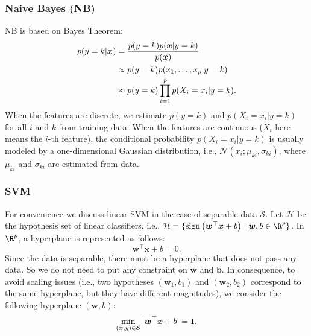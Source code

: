     \subsubsection{Naive Bayes (NB)}
        NB is based on Bayes Theorem: 
            \begin{equation}
                \begin{aligned}
                    p(y=k | \bm{x}) & = \frac{p(y=k) p(\bm{x} | y=k)}{p(\bm{x})} \\
                    & \propto p(y=k) p(x_1, \ldots, x_{p} | y=k) \\
                    & \approx p(y=k) \prod_{i=1}^{p}{p(X_i = x_i | y=k)}.
                \end{aligned}
            \end{equation}
        When the features are discrete, we estimate $p(y=k)$ and $p(X_i = x_i | y=k)$ for all $i$ and $k$ from training data.
        When the features are continuous ($X_i$ here means the $i$-th feature), the conditional probability $p(X_i = x_i | y=k)$  is usually modeled by a one-dimensional Gaussian distribution, i.e., $\mathcal{N}(x_i; \mu_{ki}, \sigma_{ki})$, where $\mu_{ki}$ and $\sigma_{ki}$ are estimated from data.
        
    \subsubsection{SVM}
        For convenience we discuss linear SVM in the case of separable data $\mathcal{S}$.
        Let $\mathcal{H}$ be the hypothesis set of linear classifiers, i.e., $\mathcal{H}=\Set{\Sign{\bm{w}^\top \bm{x} + b}}{\bm{w}, b \in \R^\nfeat}$.
        In $\R^\nfeat$, a hyperplane is represented as follows:
            \begin{equation}
                \bm{w}^\top \bm{x} + b = 0.
            \end{equation}
        Since the data is separable, there must be a hyperplane that does not pass any data.
        So we do not need to put any constraint on $\bm{w}$ and $\bm{b}$.
        In consequence, to avoid scaling issues (i.e., two hypotheses $(\bm{w}_1, b_1)$ and $(\bm{w}_2, b_2)$ correspond to the same hyperplane, but they have different magnitudes), we consider the following hyperplane $(\bm{w}, b)$:
            \begin{equation}
                \min_{(\bm{x}, y) \in \mathcal{S}} | \bm{w}^\top \bm{x} + b | = 1.
            \end{equation}
        
